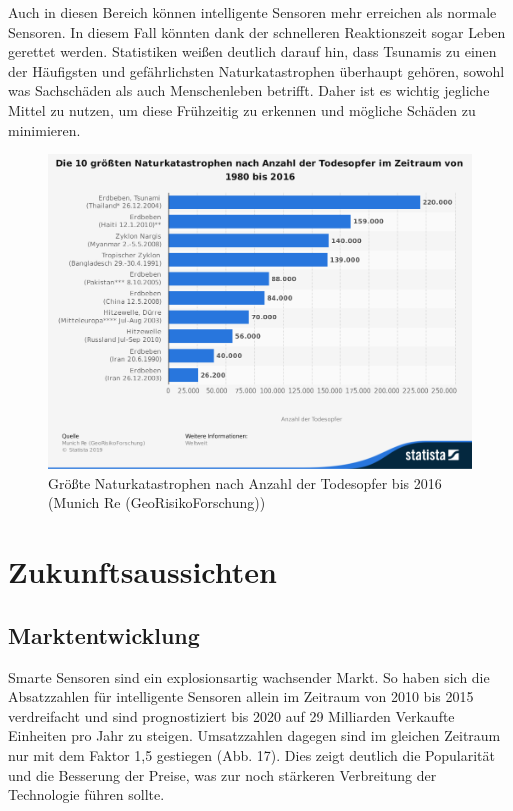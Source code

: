 \documentclass[a4paper,12pt]{scrartcl}
\begin{document}
Auch in diesen Bereich können intelligente Sensoren mehr erreichen als normale Sensoren. In diesem Fall könnten dank der schnelleren Reaktionszeit sogar Leben gerettet werden. Statistiken weißen deutlich darauf hin, dass Tsunamis zu einen der Häufigsten und gefährlichsten Naturkatastrophen überhaupt gehören, sowohl was Sachschäden als auch Menschenleben betrifft. Daher ist es wichtig jegliche Mittel zu nutzen, um diese Frühzeitig zu erkennen und mögliche Schäden zu minimieren.

\begin{figure}[H]
\centering
\includegraphics[scale=0.45]{picture/opfer}
\caption{Größte Naturkatastrophen nach Anzahl der Todesopfer bis 2016 (Munich Re (GeoRisikoForschung))}
\label{fig:Anzahl der Todesopfer durch Tsunami bis 2016}
\end{figure}

\newpage
\section{Zukunftsaussichten}
\subsection{Marktentwicklung}
Smarte Sensoren sind ein explosionsartig wachsender Markt. So haben sich die Absatzzahlen für intelligente Sensoren allein im Zeitraum von 2010 bis 2015 verdreifacht und sind prognostiziert bis 2020 auf 29 Milliarden Verkaufte Einheiten pro Jahr zu steigen. Umsatzzahlen dagegen sind im gleichen Zeitraum nur mit dem Faktor 1,5 gestiegen (Abb. 17). Dies zeigt deutlich die Popularität und die Besserung der Preise, was zur noch stärkeren Verbreitung der Technologie führen sollte. 
 
\end{document}
